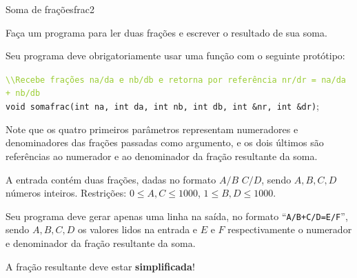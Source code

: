 \documentclass[12pt,a4paper,oneside]{article}
\begin{document}
\begin{problem}{Soma de frações}{frac}{2}

Faça um programa para ler duas frações e escrever o resultado de sua soma. 

Seu programa deve obrigatoriamente usar uma função com o seguinte protótipo:

\texttt{\textcolor{YellowGreen}{\textbackslash\textbackslash Recebe frações na/da e nb/db e retorna por referência nr/dr = na/da + nb/db}}\\
\texttt{\textcolor{Mulberry}{void} somafrac(\textcolor{Mulberry}{int} na, \textcolor{Mulberry}{int} da, \textcolor{Mulberry}{int} nb, \textcolor{Mulberry}{int} db, \textcolor{Mulberry}{int \&}nr, \textcolor{Mulberry}{int \&}dr)};

Note que os quatro primeiros parâmetros representam numeradores e denominadores das frações passadas como argumento, e os dois últimos são referências ao numerador e ao denominador da fração resultante da soma.



\InputFile

A entrada contém duas frações, dadas no formato  $A/B$\; $C/D$, sendo $A, B, C, D$ números inteiros. Restrições: $0 \leq A,C \leq 1000$, $1 \leq B,D \leq 1000$.

\OutputFile

Seu programa deve gerar apenas uma linha na saída, no formato ``\texttt{A/B+C/D=E/F}'', sendo $A, B, C, D$ os valores lidos na entrada e $E$ e $F$ respectivamente o numerador e denominador da fração resultante da soma.


\Notes
A fração resultante deve estar \textbf{simplificada}!

\Example

\begin{example}
%
\end{example}


\begin{example}
%
\end{example}

\begin{example}
%
\end{example}

\begin{example}
%
\end{example}


\end{problem}
\end{document}
